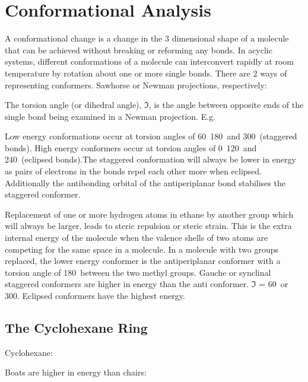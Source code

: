\section{Conformational Analysis}

A conformational change is a change in the 3 dimensional shape of a molecule that
can be achieved without breaking or reforming any bonds.
In acyclic systems, different conformations of a molecule can interconvert rapidly
at room temperature by rotation about one or more single bonds. There are 2 ways
of representing conformers. Sawhorse or Newman projections, respectively:


The torsion angle (or dihedral angle), $\Im$, is the angle between opposite ends
of the single bond being examined in a Newman projection. E.g.


Low energy conformations occur at torsion angles of 60\de\, 180\de\ and 300\de\
(staggered bonds). High energy conformers occur at torsion angles of 0\de\,
120\de\ and 240\de\ (eclipsed bonds).The staggered conformation will always be
lower in energy as pairs of electrons in the  bonds repel each other
more when eclipsed. Additionally the antibonding orbital of the antiperiplanar
\ce{C-H} bond stabilises the staggered conformer.


Replacement of one or more hydrogen atoms in ethane by another group which will
always be larger, leads to steric repulsion or steric strain. This is the extra
internal energy of the molecule when the valence shells of two atoms are competing
for the same space in a molecule. In a molecule with two groups replaced, the lower
energy conformer is the antiperiplanar conformer with a torsion angle of 180\de\
between the two methyl groups. Gauche or synclinal staggered conformers are higher
in energy than the anti conformer. $\Im$ = 60\de\ or 300\de . Eclipsed conformers
have the highest energy.

\subsection{The Cyclohexane Ring}

Cyclohexane:


Boats are higher in energy than chairs:

